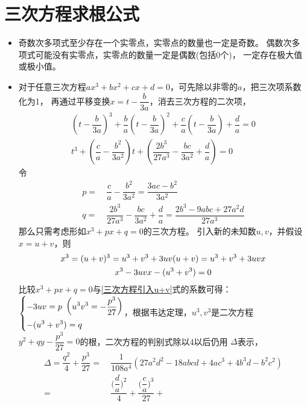 \section{三次方程求根公式}
\begin{itemize}[leftmargin=\inteval{\myitemleftmargin}pt,itemsep=
   \inteval{\myitemitempsep}pt,topsep=\inteval{\myitemtopsep}pt]
\item 奇数次多项式至少存在一个实零点，实零点的数量也一定是奇数。
偶数次多项式可能没有实零点，实零点的数量一定是偶数(包括0个)，
一定存在极大值或极小值。

\item 对于任意三次方程$ ax^3+bx^2+cx+d=0 $，可先除以非零的$ a $，把三次项系数化为1，
再通过平移变换$ x=t-\dfrac{b}{3a} $，消去三次方程的二次项，
\begin{gather*}
    \left(t-\dfrac{b}{3a}\right)^3+\dfrac{b}{a}
    \left(t-\dfrac{b}{3a}\right)^2+\dfrac{c}{a}
    \left(t-\dfrac{b}{3a}\right)+\dfrac{d}{a}=0 \\
    t^3+\left(\dfrac{c}{a}-\dfrac{b^2}{3a^2}\right)t+\left(
    \dfrac{2b^3}{27a^3}-\dfrac{bc}{3a^2}+\dfrac{d}{a}\right)=0
\end{gather*}
令
\begin{align}
    p=&\ \dfrac{c}{a}-\dfrac{b^2}{3a^2}=\dfrac{3ac-b^2}{3a^2}  
    \label{无二次项三次方程系数p} \\
    q=&\ \dfrac{2b^3}{27a^3}-\dfrac{bc}{3a^2}+\dfrac{d}{a}=
    \dfrac{2b^3-9abc+27a^2d}{27a^3} \label{无二次项三次方程系数q} 
\end{align}
那么只需考虑形如$ x^3+px+q=0 $的三次方程。
引入新的未知数$ u,v $，并假设$ x=u+v $，则
\begin{gather}
    x^3=(u+v)^3=u^3+v^3+3uv(u+v)=u^3+v^3+3uvx  \notag\\
     x^3-3uvx-(u^3+v^3)=0   \label{三次方程引入u+v}
\end{gather}
比较$ x^3+px+q=0 $与\eqref{三次方程引入u+v}式的系数可得：
$ \begin{dcases}
-3uv = p \ \left(u^3v^3=-\dfrac{p^3}{27} \right) \\
-(u^3+v^3) = q
\end{dcases} $，根据韦达定理，$ u^3,v^3 $是二次方程
$y^2+qy-\dfrac{p^3}{27}=0$的根，二次方程的判别式除以4以后仍用
$ \Delta $表示，
\begin{align} 
    \Delta=\dfrac{q^2}{4}+\dfrac{p^3}{27}=&\ 
    \dfrac{1}{108a^4}(27a^2d^2-18abcd+4ac^3+4b^3d-b^2c^2) 
    \label{三次方程判别式q2_4+p3_27}  \\
    =&\ \dfrac{\Big(\dfrac{d}{a}\Big)^2}{4}+\dfrac{\Big(\dfrac{c}{a}\Big)^3}{27}+

\end{align}
\end{itemize}
